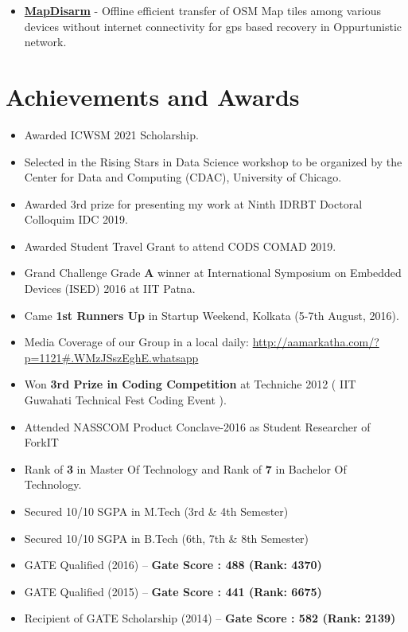\documentclass[margin, centered]{res}
\begin{document}
\begin{resume}
\begin{itemize}[leftmargin=*]
 \item \textbf{\href{https://github.com/hridaydutta123/MapDisarm}{MapDisarm}} - Offline efficient transfer of OSM Map tiles among various devices without internet connectivity for gps based recovery in Oppurtunistic network.
\end{itemize}

\section{Achievements and Awards}
\begin{itemize}[leftmargin=*]
 \item Awarded ICWSM 2021 Scholarship.
 \item Selected in the Rising Stars in Data Science workshop to be organized by the Center for Data and Computing (CDAC), University of Chicago.
 \item Awarded 3rd prize for presenting my work at Ninth IDRBT Doctoral Colloquim IDC 2019.
 \item Awarded Student Travel Grant to attend CODS COMAD 2019.
 \item Grand Challenge Grade \textbf{A} winner at International Symposium on Embedded Devices (ISED) 2016 at IIT Patna.
 \item Came \textbf{1st Runners Up} in Startup Weekend, Kolkata (5-7th August, 2016).
 \item Media Coverage of our Group in a local daily: \url{http://aamarkatha.com/?p=1121#.WMzJSszEghE.whatsapp}
 \item Won \textbf{3rd Prize in Coding Competition} at Techniche 2012 ( IIT Guwahati Technical Fest Coding Event ).
 \item Attended NASSCOM Product Conclave-2016 as Student Researcher of ForkIT
 \item Rank of \textbf{3} in Master Of Technology and Rank of \textbf{7} in Bachelor Of Technology.
 \item Secured 10/10 SGPA in M.Tech (3rd \& 4th Semester)
 \item Secured 10/10 SGPA in B.Tech (6th, 7th \& 8th Semester)
 \item GATE Qualified (2016) – \textbf{Gate Score : 488 (Rank: 4370) }
 \item GATE Qualified (2015) – \textbf{Gate Score : 441 (Rank: 6675) }
 \item Recipient of GATE Scholarship (2014) – \textbf{Gate Score : 582 (Rank: 2139) }


\end{itemize}
\end{resume}
\end{document}
